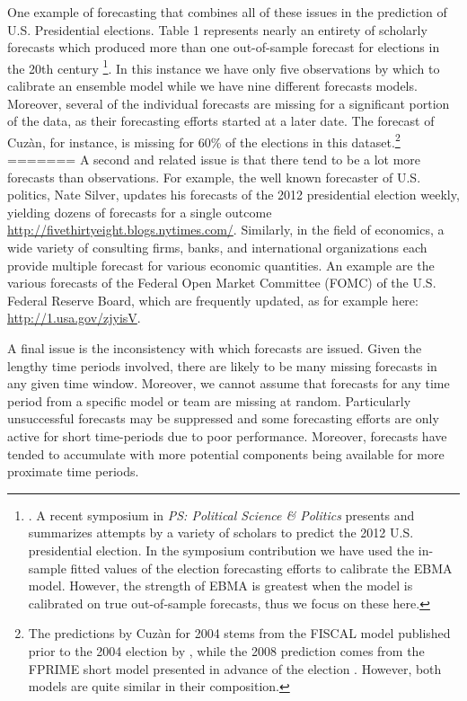 \documentclass[12pt,fullpage,endnotes]{article}
\begin{document}
One example of forecasting that combines all of these issues in the
prediction of U.S. Presidential elections.  Table 1 represents nearly an
entirety of scholarly forecasts which produced more than one out-of-sample forecast
for elections in the 20th century \footnote{
\cite[See, for example]{Fair:2009,Fair2011,Abramowitz:2008,Campbell:2008,Cuzan:2004,Cuzan:Bundrick:2008,hibbs:2012,Lockerbie:2008,Erikson:Wlezien:2008,Graefe:2010,Holbrook:2008}.
A recent symposium in {\em	 PS: Political Science \& Politics} presents and summarizes attempts by a variety of scholars to predict the 2012 U.S. presidential election. In the symposium contribution we have used the in-sample fitted values of the election forecasting efforts to calibrate the EBMA model. However, the strength of EBMA is greatest when the model is calibrated on true out-of-sample forecasts, thus we focus on these here.}.  In this instance
we have only five observations by which to calibrate an ensemble model while we
have nine different forecasts models.  Moreover, several of the individual forecasts
are missing for a significant portion of the data, as their forecasting efforts started at a later date. The forecast of
Cuz\`an, for instance, is missing for 60\% of the elections in this
dataset.\footnote{The predictions by Cuz\`an for 2004 stems from the FISCAL model published prior to the 2004 election by \citet{Cuzan:2004}, while the 2008 prediction comes from the FPRIME short model presented in advance of the election \citep{Cuzan:Bundrick:2008}. However, both models are quite similar in their composition.} 
=======
A second and related issue is that there tend to be a lot more
forecasts than observations.  For example, the well known forecaster
of U.S. politics, Nate Silver, updates his forecasts of the 2012
presidential election weekly, yielding dozens of forecasts for a
single outcome \url{http://fivethirtyeight.blogs.nytimes.com/}.
Similarly, in the field of economics, a wide variety of consulting
firms, banks, and international organizations each provide multiple
forecast for various economic quantities. An example are the various
forecasts of the Federal Open Market Committee (FOMC) of the
U.S. Federal Reserve Board, which are frequently updated, as for
example here: \url{http://1.usa.gov/zjyisV}.

A final issue is the inconsistency with which forecasts are
issued. Given the lengthy time periods involved, there are likely to
be many missing forecasts in any given time window.  Moreover, we
cannot assume that forecasts for any time period from a specific model
or team are missing at random.  Particularly unsuccessful forecasts
may be suppressed and some forecasting efforts are only active for
short time-periods due to poor performance.  Moreover, forecasts have
tended to accumulate with more potential components being available
for more proximate time periods.
\end{document}
